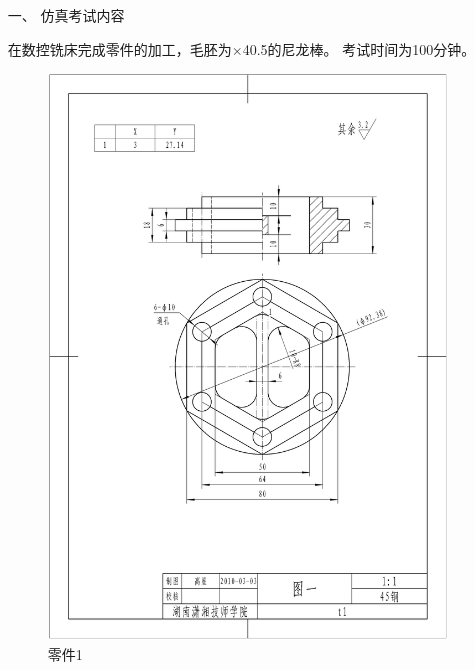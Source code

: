 \documentclass[12pt,twocolumn,landscape,UTF8,twoside]{ctexart}
\begin{document}
\begin{spacing}{1.3}
	\begin{enumerate} [1、]
		\item[\heiti 一、] {\heiti 仿真考试内容}

在数控铣床完成零件的加工，毛胚为$\times$40.5的尼龙棒。
 考试时间为100分钟。
\begin{figure}[h]
	\centering
	\includegraphics[width=0.5\linewidth,trim=150 200 80 150,clip]{image/5.png}
	\caption{零件1}
	\label{fig:3}
\end{figure}


%



\end{enumerate}
\end{spacing}
\end{document}
